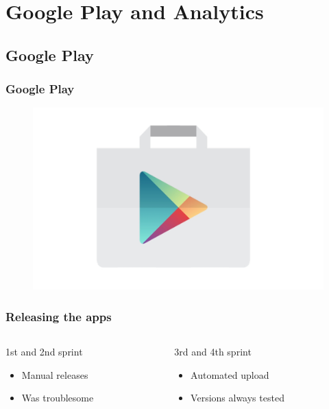 \section{Google Play and Analytics}
\subsection{Google Play}
\begin{frame}
	\frametitle{Google Play}
	\begin{figure}[H]
		\centering
		\includegraphics[width= 0.8 \textwidth]{pictures/Play_icon.jpg}
	\end{figure}
\end{frame}

\begin{frame}
	\begin{center}
		\frametitle{Releasing the apps}
		\begin{columns}[T] %
			\begin{column}{.3\textwidth}
				1st and 2nd sprint
				\begin{itemize}
					\item Manual releases
					\item Was troublesome
				\end{itemize}
			\end{column}%
			\begin{column}{.3\textwidth}
				3rd and 4th sprint
				\begin{itemize}
					\item Automated upload
					\item Versions always tested
				\end{itemize}
			\end{column}%
	\end{columns}
	\end{center}
\end{frame}

